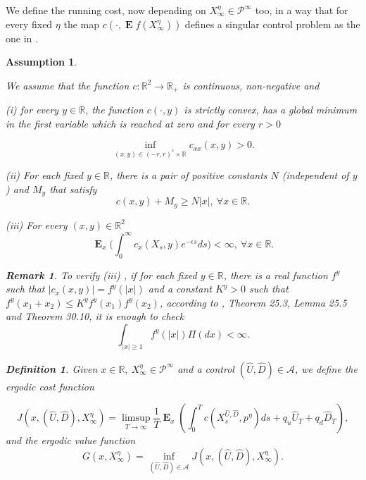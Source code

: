 \documentclass{article}
\newtheorem{assumptions}[thm]{Assumption}
\newtheorem{remark}[thm]{Remark}
\newtheorem{definition}[thm]{Definition}
\newcommand{\R}{\mathbb{R}}%
\newcommand\E{\operatorname{\mathbf{E}}}
\begin{document}
We define the running cost, now depending on $X^{\eta}_{\infty} \in \mathcal{P}^{\infty} $ too, in a way that for every fixed $\eta$ the map $c(\cdot, \E f\left(X^{\eta}_{\infty} \right)) $ defines a singular control problem as the one in \cite{MO}.

\begin{assumptions}\label{A:Assumptions2MEANFIELDGAME}

We assume that the function
$c \colon \mathbb{R}^2  \rightarrow \mathbb{R}_+$ is continuous, non-negative and

\vskip1mm\par\noindent
{\rm(i)} 
for every $y \in \mathbb{R}$, the function $c(\cdot,y)$ is strictly convex, has a global minimum in the first variable which is reached at zero and for every $r>0$

$$\inf_{(x,y) \in  (-r,r)^c \times \mathbb{R} }c_{xx}(x,y)>0. $$

\vskip1mm\par\noindent
{\rm(ii)}  For each fixed $y \in \mathbb{R}$, there is a pair of positive constants $N$ (independent of $y$) and $M_y$ that satisfy
$$ c(x,y)+ M_y \geq N \vert x  \vert  , \  \forall x \in \mathbb{R} .$$

\vskip1mm\par\noindent
{\rm(iii)} 
For every $(x,y) \in \mathbb{R}^2$
 \[\E_x \bigg(\int_0^{\infty}c_x(X_s,y)e^{-\epsilon s}ds \bigg) < \infty , \ \forall x \in \mathbb{R} .\] 

\begin{remark}
To verify {\rm(iii)} , if for each fixed $y \in \mathbb{R}$, there is a real function $f^{y}$ such that 
$\vert c_{x}(x,y) \vert =f^{y}(\vert x \vert)$ and a  constant $K^{y}>0$ such that 
$f^{y}(x_1+x_2) \leq K^{y} f^{y}(x_1) f^{y}(x_2)$, 
according to \cite{KIS}, Theorem 25.3, Lemma 25.5 and Theorem 30.10,
it is enough to check
$$
\int_{\vert x \vert \geq 1} f^{y}( \vert x\vert ) \Pi(dx) <\infty.
$$
\end{remark}

\begin{definition}\label{D:ergodicvaluefunctionMFG}
Given $x\in\R, \ X^{\eta}_{\infty} \in \mathcal{P}^{\infty}$ and a control $(\hat{U},\hat{D})\in\mathcal{A}$, we define the ergodic cost function 


\begin{equation*}
J(x,(\hat{U},\hat{D}), X^{\eta}_{\infty} )
=  \limsup_{T \to \infty} \frac{1}{T} \E_x  \left(   \int_{0}^T c(X^{\hat{U},\hat{D}}_s,p^{\eta})ds    +q_u \hat{U}_T +q_d \hat{D}_T \right),
\end{equation*}
and the ergodic value function 
\[
G(x, X^{\eta}_{\infty} ) = \inf_{(\hat{U},\hat{D}) \in \mathcal{A}} J(x,(\hat{U},\hat{D}), X^{\eta}_{\infty} ).
\]
\end{definition}




\end{assumptions}
\end{document}
